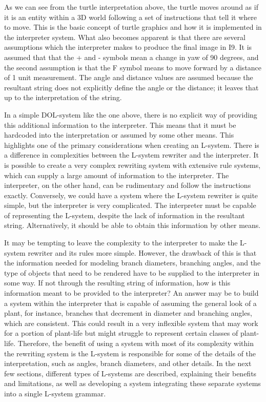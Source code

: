 \noindent
As we can see from the turtle interpretation above, the turtle moves around as if it is an entity within a 3D world following a set of instructions that tell it where to move. This is the basic concept of turtle graphics and how it is implemented in the interpreter system. What also becomes apparent is that there are several assumptions which the interpreter makes to produce the final image in I9. It is assumed that that the + and - symbols mean a change in yaw of 90 degrees, and the second assumption is that the F symbol means to move forward by a distance of 1 unit measurement. The angle and distance values are assumed because the resultant string does not explicitly define the angle or the distance; it leaves that up to the interpretation of the string. 

In a simple DOL-system like the one above, there is no explicit way of providing this additional information to the interpreter. This means that it must be hardcoded into the interpretation or assumed by some other means. This highlights one of the primary considerations when creating an L-system. There is a difference in complexities between the L-system rewriter and the interpreter. It is possible to create a very complex rewriting system with extensive rule systems, which can supply a large amount of information to the interpreter. The interpreter, on the other hand, can be rudimentary and follow the instructions exactly. Conversely, we could have a system where the L-system rewriter is quite simple, but the interpreter is very complicated. The interpreter must be capable of representing the L-system, despite the lack of information in the resultant string. Alternatively, it should be able to obtain this information by other means. 

It may be tempting to leave the complexity to the interpreter to make the L-system rewriter and its rules more simple. However, the drawback of this is that the information needed for modeling branch diameters, branching angles, and the type of objects that need to be rendered have to be supplied to the interpreter in some way. If not through the resulting string of information, how is this information meant to be provided to the interpreter? An answer may be to build a system within the interpreter that is capable of assuming the general look of a plant, for instance, branches that decrement in diameter and branching angles, which are consistent. This could result in a very inflexible system that may work for a portion of plant-life but might struggle to represent certain classes of plant-life. Therefore, the benefit of using a system with most of its complexity within the rewriting system is the L-system is responsible for some of the details of the interpretation, such as angles, branch diameters, and other details. In the next few sections, different types of L-systems are described, explaining their benefits and limitations, as well as developing a system integrating these separate systems into a single L-system grammar.   


